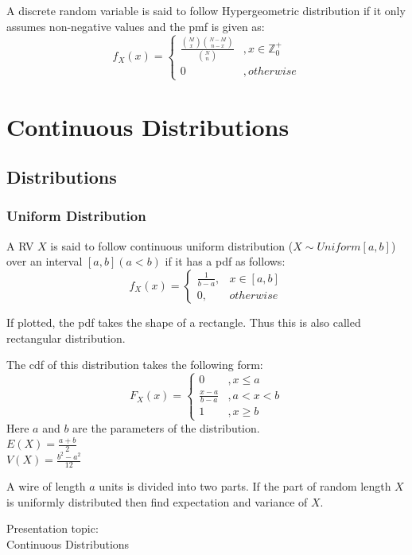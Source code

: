 \documentclass[11pt,letterpaper]{article}
\newenvironment{problem}[2][Problem]                                  
        {\begin{tcolorbox}[colback=white,colframe=gray!50,title=#1 #2]}
        {\end{tcolorbox}}
\begin{document}
A discrete random variable is said to follow Hypergeometric distribution if it only 
assumes non-negative values and the pmf is given as:
\[
  f_X(x) = \begin{cases} \frac{{M\choose x} {N-M \choose n-x}}{{N \choose n}} &, x \in \mathbb{Z}^+_0\\
    0 &, otherwise
  \end{cases}
\]

\section{Continuous Distributions}
\subsection{Distributions}
\subsubsection{Uniform Distribution}
A RV $X$ is said to follow continuous uniform distribution ($X \sim Uniform[a,b]$) over 
an interval $[a,b] (a<b)$ if it has a pdf as follows: 
\[
  f_X(x) = \begin{cases} \frac{1}{b-a} , & x \in [a,b]\\ 
  0, & otherwise\end{cases}
\]

If plotted, the pdf takes the shape of a rectangle. Thus this is also called rectangular 
distribution. 

\noindent The cdf of this distribution takes the following form: 
\[
  F_X(x) = \begin{cases} 0&,x\leq a\\ 
  \frac{x-a}{b-a}&,a< x< b\\ 
  1&,x\geq b\end{cases}
\]
Here $a$ and $b$ are the parameters of the distribution.\\ 
$E(X) = \frac{a+b}{2}$\\ 
$V(X) = \frac{b^2 - a^2}{12}$

\begin{problem}{11}
  A wire of length $a$ units is divided into two parts. If the part of random length $X$ is 
  uniformly distributed then find expectation and variance of $X$.
\end{problem}

\begin{mdframed}
  \Large Presentation topic:\\
  \normalsize Continuous Distributions
\end{mdframed}
\end{document}
